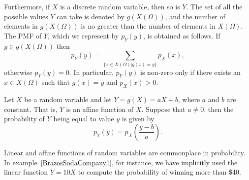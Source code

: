 Furthermore, if $X$ is a discrete random variable, then so is $Y$.
The set of all the possible values $Y$ can take is denoted by $g(X(\Omega))$, and the number of elements in $g(X(\Omega))$ is no greater than the number of elements in $X(\Omega)$.
The PMF of $Y$, which we represent by $p_Y (y)$, is obtained as follows.
If $y \in g(X(\Omega))$ then
\begin{equation} \label{equation:DefinitionFunctionPMF}
p_Y (y) = \sum_{ \{x \in X(\Omega) | g(x) = y \} } p_X (x) ,
\end{equation}
otherwise $p_Y (y) = 0$.
In particular, $p_Y (y)$ is non-zero only if there exists an $x \in X(\Omega)$ such that $g(x) = y$ and $p_X (x) > 0$.

\begin{example}
Let $X$ be a random variable and let $Y = g(X) = aX + b$, where $a$ and $b$ are constant.
That is, $Y$ is an affine function of $X$.
Suppose that $a \neq 0$, then the probability of $Y$ being equal to value $y$ is given by
\begin{equation*}
p_Y(y) = p_X \left( \frac{ y - b }{a} \right) .
\end{equation*}
\end{example}

Linear and affine functions of random variables are commonplace in probability.
In example~\ref{BrazosSodaCompany1}, for instance, we have implicitly used the linear function $Y = 10 X$ to compute the probability of winning more than \$40.

